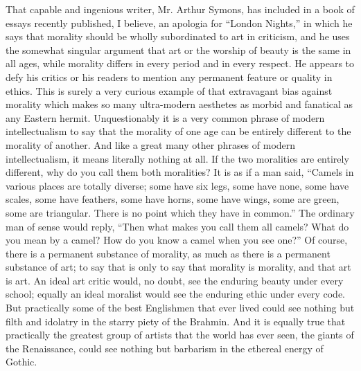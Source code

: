 
That capable and ingenious writer, Mr. Arthur Symons, has included in a book of essays recently published, I believe, an apologia for “London Nights,” in which he says that morality should be wholly subordinated to art in criticism, and he uses the somewhat singular argument that art or the worship of beauty is the same in all ages, while morality differs in every period and in every respect. He appears to defy his critics or his readers to mention any permanent feature or quality in ethics. This is surely a very curious example of that extravagant bias against morality which makes so many ultra-modern aesthetes as morbid and fanatical as any Eastern hermit. Unquestionably it is a very common phrase of modern intellectualism to say that the morality of one age can be entirely different to the morality of another. And like a great many other phrases of modern intellectualism, it means literally nothing at all. If the two moralities are entirely different, why do you call them both moralities? It is as if a man said, “Camels in various places are totally diverse; some have six legs, some have none, some have scales, some have feathers, some have horns, some have wings, some are green, some are triangular. There is no point which they have in common.” The ordinary man of sense would reply, “Then what makes you call them all camels? What do you mean by a camel? How do you know a camel when you see one?” Of course, there is a permanent substance of morality, as much as there is a permanent substance of art; to say that is only to say that morality is morality, and that art is art. An ideal art critic would, no doubt, see the enduring beauty under every school; equally an ideal moralist would see the enduring ethic under every code. But practically some of the best Englishmen that ever lived could see nothing but filth and idolatry in the starry piety of the Brahmin. And it is equally true that practically the greatest group of artists that the world has ever seen, the giants of the Renaissance, could see nothing but barbarism in the ethereal energy of Gothic.

